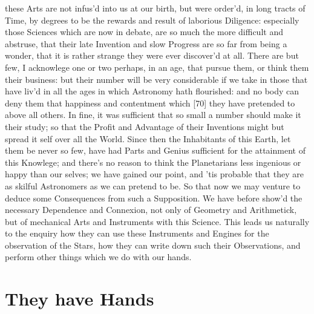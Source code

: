 \documentclass[letterpaper]{book}
\begin{document}
these Arts are not infus'd into us at our birth, but were order'd, in long
tracts of Time, by degrees to be the rewards and result of laborious
Diligence: especially those Sciences which are now in debate, are so much
the more difficult and abstruse, that their late Invention and slow Progress
are so far from being a wonder, that it is rather strange they were ever
discover'd at all. There are but few, I acknowlege one or two perhaps, in an
age, that pursue them, or think them their business: but their number will
be very considerable if we take in those that have liv'd in all the ages in
which Astronomy hath flourished: and no body can deny them that happiness
and contentment which [70] they have pretended to above all others. In fine,
it was sufficient that so small a number should make it their study; so that
the Profit and Advantage of their Inventions might but spread it self over
all the World. Since then the Inhabitants of this Earth, let them be never
so few, have had Parts and Genius sufficient for the attainment of this
Knowlege; and there's no reason to think the Planetarians less ingenious or
happy than our selves; we have gained our point, and 'tis probable that they
are as skilful Astronomers as we can pretend to be. So that now we may
venture to deduce some Consequences from such a Supposition.  We have before
show'd the necessary Dependence and Connexion, not only of Geometry and
Arithmetick, but of mechanical Arts and Instruments with this Science. This
leads us naturally to the enquiry how they can use these Instruments and
Engines for the observation of the Stars, how they can write down such their
Observations, and perform other things which we do with our hands.


\section{They have Hands}
\end{document}
